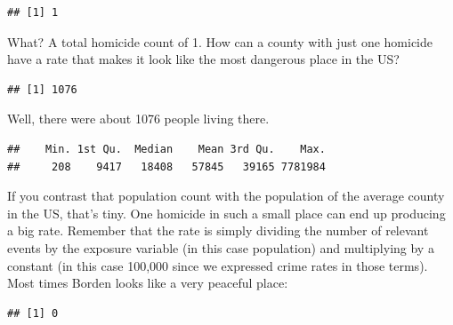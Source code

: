\documentclass[
]{book}
\newenvironment{Shaded}{\begin{snugshade}}{\end{snugshade}}
\newcommand{\FunctionTok}[1]{\textcolor[rgb]{0.00,0.00,0.00}{#1}}
\newcommand{\NormalTok}[1]{#1}
\newcommand{\SpecialCharTok}[1]{\textcolor[rgb]{0.00,0.00,0.00}{#1}}
\begin{document}
\begin{verbatim}
## [1] 1
\end{verbatim}

What? A total homicide count of 1. How can a county with just one homicide have a rate that makes it look like the most dangerous place in the US?

\begin{Shaded}
\end{Shaded}

\begin{verbatim}
## [1] 1076
\end{verbatim}

Well, there were about 1076 people living there.

\begin{Shaded}
\end{Shaded}

\begin{verbatim}
##    Min. 1st Qu.  Median    Mean 3rd Qu.    Max. 
##     208    9417   18408   57845   39165 7781984
\end{verbatim}

If you contrast that population count with the population of the average county in the US, that's tiny. One homicide in such a small place can end up producing a big rate. Remember that the rate is simply dividing the number of relevant events by the exposure variable (in this case population) and multiplying by a constant (in this case 100,000 since we expressed crime rates in those terms). Most times Borden looks like a very peaceful place:

\begin{Shaded}
\end{Shaded}

\begin{verbatim}
## [1] 0
\end{verbatim}

\begin{Shaded}
\end{Shaded}
\end{document}
